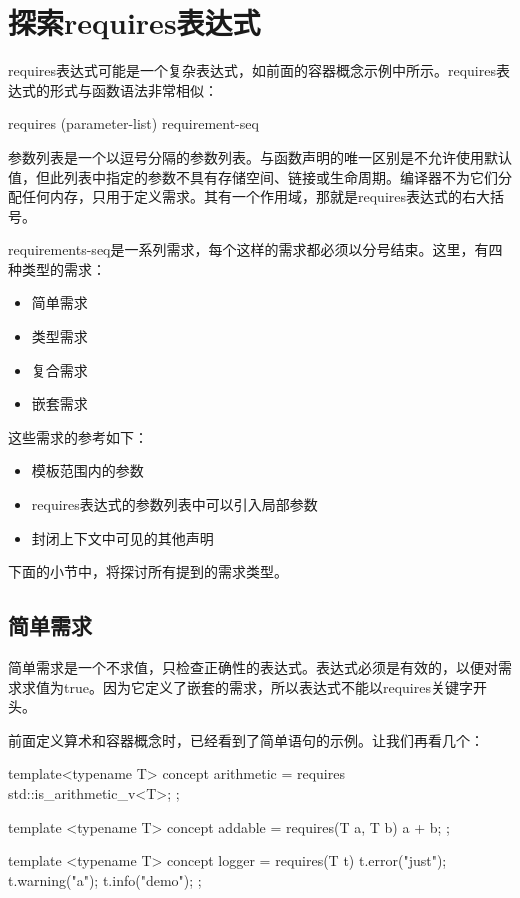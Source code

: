 \section{探索requires表达式}

requires表达式可能是一个复杂表达式，如前面的容器概念示例中所示。requires表达式的形式与函数语法非常相似：

\begin{cpp}
requires (parameter-list) { requirement-seq }
\end{cpp}

参数列表是一个以逗号分隔的参数列表。与函数声明的唯一区别是不允许使用默认值，但此列表中指定的参数不具有存储空间、链接或生命周期。编译器不为它们分配任何内存，只用于定义需求。其有一个作用域，那就是requires表达式的右大括号。

requirements-seq是一系列需求，每个这样的需求都必须以分号结束。这里，有四种类型的需求：

\begin{itemize}
\item
简单需求

\item
类型需求

\item
复合需求

\item
嵌套需求
\end{itemize}

这些需求的参考如下：

\begin{itemize}
\item
模板范围内的参数

\item
requires表达式的参数列表中可以引入局部参数

\item
封闭上下文中可见的其他声明
\end{itemize}

下面的小节中，将探讨所有提到的需求类型。

\subsection{简单需求}

简单需求是一个不求值，只检查正确性的表达式。表达式必须是有效的，以便对需求求值为true。因为它定义了嵌套的需求，所以表达式不能以requires关键字开头。

前面定义算术和容器概念时，已经看到了简单语句的示例。让我们再看几个：

\begin{cpp}
template<typename T>
concept arithmetic = requires
{
	std::is_arithmetic_v<T>;
};

template <typename T>
concept addable = requires(T a, T b)
{
	a + b;
};

template <typename T>
concept logger = requires(T t)
{
	t.error("just");
	t.warning("a");
	t.info("demo");
};
\end{cpp}

